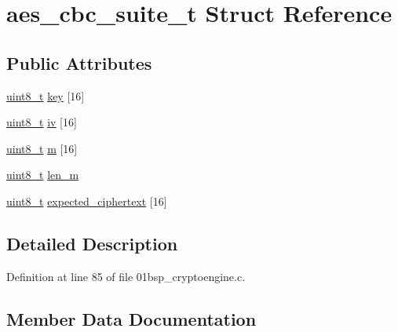 \hypertarget{structaes__cbc__suite__t}{}\section{aes\+\_\+cbc\+\_\+suite\+\_\+t Struct Reference}
\label{structaes__cbc__suite__t}
\subsection*{Public Attributes}
\begin{DoxyCompactItemize}
\item 
\hyperlink{_p_e___types_8h_aba7bc1797add20fe3efdf37ced1182c5}{uint8\+\_\+t} \hyperlink{structaes__cbc__suite__t_a630d91fa2070a05d4f24ca0c9afe8902}{key} \mbox{[}16\mbox{]}
\item 
\hyperlink{_p_e___types_8h_aba7bc1797add20fe3efdf37ced1182c5}{uint8\+\_\+t} \hyperlink{structaes__cbc__suite__t_ac2d1be7021cd9925fe1fd644a7e9fc01}{iv} \mbox{[}16\mbox{]}
\item 
\hyperlink{_p_e___types_8h_aba7bc1797add20fe3efdf37ced1182c5}{uint8\+\_\+t} \hyperlink{structaes__cbc__suite__t_aec468586dc8ee15780ba1397067c2026}{m} \mbox{[}16\mbox{]}
\item 
\hyperlink{_p_e___types_8h_aba7bc1797add20fe3efdf37ced1182c5}{uint8\+\_\+t} \hyperlink{structaes__cbc__suite__t_abc5b17b5efda1c3fd253ff8d276eda1e}{len\+\_\+m}
\item 
\hyperlink{_p_e___types_8h_aba7bc1797add20fe3efdf37ced1182c5}{uint8\+\_\+t} \hyperlink{structaes__cbc__suite__t_aa227c64388c0d33e5c5a297922ac40f5}{expected\+\_\+ciphertext} \mbox{[}16\mbox{]}
\end{DoxyCompactItemize}


\subsection{Detailed Description}


Definition at line 85 of file 01bsp\+\_\+cryptoengine.\+c.



\subsection{Member Data Documentation}
